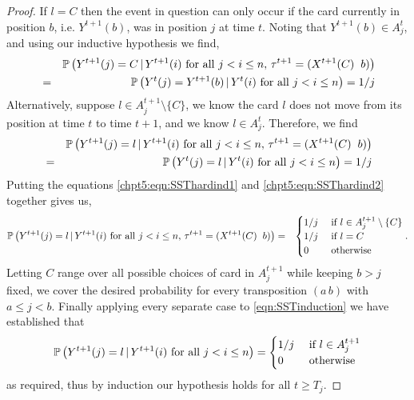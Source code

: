 \documentclass[11pt]{report}
\begin{document}
\begin{proof}
	If $l = C$ then the event in question can only occur if  the card currently in position $b$, i.e. $Y^{t+1}(b)$, was in position $j$ at time $t$. Noting that $Y^{t+1}(b) \in A_{j}^{t}$, and using our inductive hypothesis we find,
	\begin{eqnarray}
	& & \mathbb{P}\left(Y^{t+1}(j) = C \, | \, Y^{t+1}(i) \textnormal{ for all } j < i \leq n , \, \tau^{t+1} = (X^{t+1}(C) \hspace{0.2cm} b)\right) \nonumber \\
	& = & \mathbb{P}\left(Y^{t}(j) = Y^{t+1}(b) \, | \, Y^{t}(i) \textnormal{ for all } j < i \leq n  \right) = 1/j \label{chpt5:eqn:SSThardind1}
	\end{eqnarray}
	Alternatively, suppose $l \in A_{j}^{t+1} \setminus \{C\}$, we know the card $l$ does not move from its position at time $t$ to time $t+1$, and we know $l \in A_{j}^{t}$. Therefore, we find
	\begin{eqnarray}
	& & \mathbb{P}\left(Y^{t+1}(j) = l \, | \, Y^{t+1}(i) \textnormal{ for all } j < i \leq n , \, \tau^{t+1} = (X^{t+1}(C) \hspace{0.2cm} b)\right) \nonumber \\
	& = & \mathbb{P}\left(Y^{t}(j) = l \, | \, Y^{t}(i) \textnormal{ for all } j < i \leq n  \right) = 1/j \label{chpt5:eqn:SSThardind2}
	\end{eqnarray}
	Putting the equations \eqref{chpt5:eqn:SSThardind1} and \eqref{chpt5:eqn:SSThardind2} together gives us,
	\begin{eqnarray*}
		\mathbb{P}\left(Y^{t+1}(j) = l \, | \,  Y^{t+1}(i) \textnormal{ for all } j < i \leq n, \, \tau^{t+1} = (X^{t+1}(C) \hspace{0.2cm} b)\right) & = & 
		\begin{cases}
			1/j & \textnormal{ if }  l \in A_{j}^{t+1} \setminus\{ C \}\\
			1/j & \textnormal{ if }  l = C \\
			0 & \textnormal{ otherwise }
		\end{cases}.
	\end{eqnarray*}
	Letting $C$ range over all possible choices of card in $A_{j}^{t+1}$ while keeping $b> j$ fixed, we cover the desired probability for every transposition $(a\, b)$ with $a\leq j < b$. 
	Finally applying every separate case to \eqref{eqn:SSTinduction} we have established that 
	\[\mathbb{P}\left(Y^{t+1}(j) = l \, | \, Y^{t+1}(i) \textnormal{ for all } j < i \leq n
	\right) = \begin{cases}
	1/j & \textnormal{ if } l \in A_{j}^{t+1}\\
	0 & \textnormal{ otherwise } 
	\end{cases} \]
	as required, thus by induction our hypothesis holds for all 
	$t \geq T_{j}$.
	
\end{proof}
\end{document}

